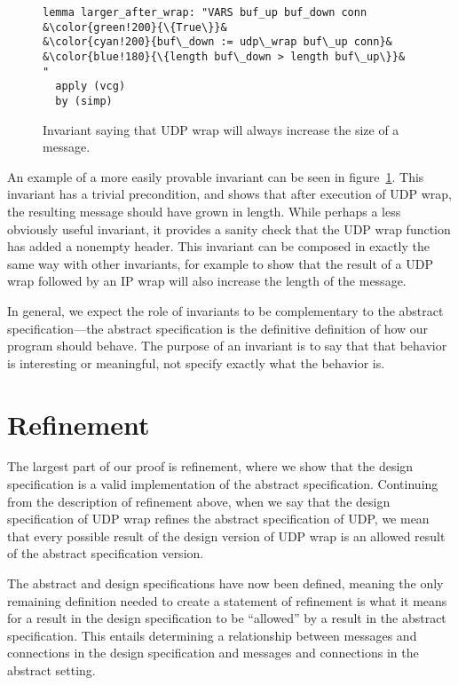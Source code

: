 \documentclass[twoside]{memoir}
\begin{document}
\begin{figure}
    \centering
\begin{lstlisting}[language=isabelle]
lemma larger_after_wrap: "VARS buf_up buf_down conn
&\color{green!200}{\{True\}}&
&\color{cyan!200}{buf\_down := udp\_wrap buf\_up conn}&
&\color{blue!180}{\{length buf\_down > length buf\_up\}}&
"
  apply (vcg)
  by (simp)
\end{lstlisting}
    \caption{Invariant saying that UDP wrap will always increase the size
        of a message.}
    \label{fig:inv-wrap-inc}
\end{figure}

An example of a more easily provable invariant can be seen in figure~\ref{fig:inv-wrap-inc}. This invariant has a trivial precondition,
and shows that after execution of UDP wrap, the resulting
message should have grown in length.
While perhaps a less obviously useful invariant,
it provides a sanity check that the UDP wrap function
has added a nonempty header.
This invariant can be composed in exactly the same way with other
invariants, for example to show that the result of a UDP wrap followed
by an IP wrap will also increase the length of the message.

In general, we expect the role of invariants to be complementary to the
abstract specification---the abstract specification is the definitive
definition of how our program should behave.
The purpose of an invariant is to say that that behavior is interesting
or meaningful, not specify exactly what the behavior is.


\section{Refinement}

The largest part of our proof is refinement, where we show that
the design specification is a valid implementation of the abstract specification.
Continuing from the description of refinement above,
when we say that the design specification of UDP wrap refines the
abstract specification of UDP, we mean that
every possible result of the design version of UDP wrap is an allowed
result of the abstract specification version.

The abstract and design specifications have now been defined, meaning the
only remaining definition needed to create a statement of refinement is
what it means for a result in the design specification to be ``allowed''
by a result in the abstract specification.
This entails determining a relationship between messages and connections
in the design specification and messages and connections in the abstract setting.
\end{document}
